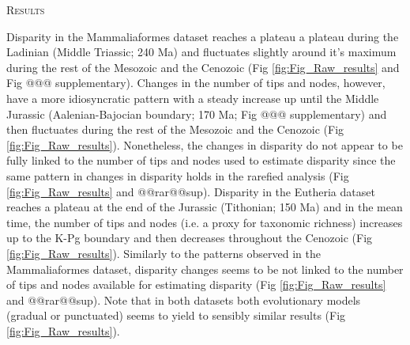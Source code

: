 \documentclass[12pt,letterpaper]{article}
\renewcommand{\section}[1]{%
\bigskip
\begin{center}
\begin{Large}
\normalfont\scshape #1
\medskip
\end{Large}
\end{center}}
\begin{document}

%
%

\section{Results}
Disparity in the Mammaliaformes dataset reaches a plateau a plateau during the Ladinian (Middle Triassic; 240 Ma) and fluctuates slightly around it's maximum during the rest of the Mesozoic and the Cenozoic (Fig \ref{fig:Fig_Raw_results} and Fig @@@ supplementary).
Changes in the number of tips and nodes, however, have a more idiosyncratic pattern with a steady increase up until the Middle Jurassic (Aalenian-Bajocian boundary; 170 Ma; Fig @@@ supplementary) and then fluctuates during the rest of the Mesozoic and the Cenozoic (Fig \ref{fig:Fig_Raw_results}).
Nonetheless, the changes in disparity do not appear to be fully linked to the number of tips and nodes used to estimate disparity since the same pattern in changes in disparity holds in the rarefied analysis (Fig \ref{fig:Fig_Raw_results} and @@rar@@sup).
Disparity in the Eutheria dataset reaches a plateau at the end of the Jurassic (Tithonian; 150 Ma) and in the mean time, the number of tips and nodes (i.e. a proxy for taxonomic richness) increases up to the K-Pg boundary and then decreases throughout the Cenozoic (Fig \ref{fig:Fig_Raw_results}).
Similarly to the patterns observed in the Mammaliaformes dataset, disparity changes seems to be not linked to the number of tips and nodes available for estimating disparity (Fig \ref{fig:Fig_Raw_results} and @@rar@@sup).
Note that in both datasets both evolutionary models (gradual or punctuated) seems to yield to sensibly similar results (Fig \ref{fig:Fig_Raw_results}).
\end{document}
